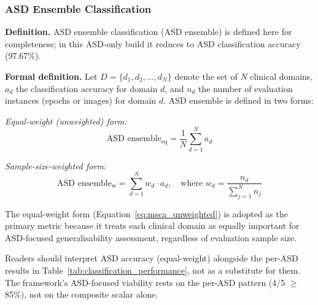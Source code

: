 \subsubsection{ASD Ensemble Classification}

\textbf{Definition.} ASD ensemble classification (ASD ensemble) is defined here for completeness; in this ASD-only build it reduces to ASD classification accuracy (97.67\%).


\textbf{Formal definition.} Let $D = \{d_1, d_2, \ldots, d_N\}$ denote the set of $N$ clinical domains, $a_d$ the classification accuracy for domain $d$, and $n_d$ the number of evaluation instances (epochs or images) for domain $d$. ASD ensemble is defined in two forms:

\textit{Equal-weight (unweighted) form:}
\begin{equation}
\label{eq:msca_unweighted}
\text{ASD ensemble}_{\text{eq}} = \frac{1}{N} \sum_{d=1}^{N} a_d
\end{equation}

\textit{Sample-size-weighted form:}
\begin{equation}
\label{eq:msca_weighted}
\text{ASD ensemble}_{\text{w}} = \sum_{d=1}^{N} w_d \cdot a_d, \quad \text{where } w_d = \frac{n_d}{\sum_{j=1}^{N} n_j}
\end{equation}

The equal-weight form (Equation~\ref{eq:msca_unweighted}) is adopted as the primary metric because it treats each clinical domain as equally important for ASD-focused generalisability assessment, regardless of evaluation sample size.

Readers should interpret ASD accuracy (equal-weight) alongside the per-ASD results in Table~\ref{tab:classification_performance}, not as a substitute for them. The framework's ASD-focused viability rests on the per-ASD pattern (4/5 $\geq$ 85\%), not on the composite scalar alone.

